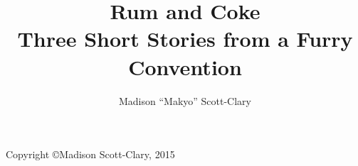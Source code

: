 \documentclass[12pt,letterpaper,oneside]{memoir}
\title{\huge{Rum and Coke}\\\large{Three Short Stories from a Furry Convention}}
\author{Madison ``Makyo'' Scott-Clary}
\date{}
\begin{document}
  

  \frontmatter
  \maketitle
  \vspace{6in}

  \begin{center}
    Copyright \copyright Madison Scott-Clary, 2015
  \end{center}

  \newpage
  \tableofcontents

  

  \mainmatter
  

  

  

  \backmatter
  
\end{document}
